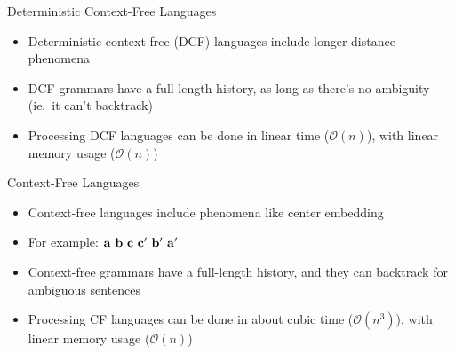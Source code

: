 \documentclass{beamer}
\newcommand{\detail}[1]{{\color{lightgrey}\small{}#1}}
\begin{document}
\begin{frame}{Deterministic Context-Free Languages}
\begin{block}{}
\begin{itemize}
	\item Deterministic context-free (DCF) languages include longer-distance phenomena
	\item DCF grammars have a full-length history, as long as there's no ambiguity (ie.\ it can't backtrack)
	\pause
	\item Processing DCF languages can be done in linear time \detail{($\mathcal{O}(n)$)}, with linear memory usage \detail{($\mathcal{O}(n)$)}
\end{itemize}
\end{block}
\end{frame}


\begin{frame}{Context-Free Languages}
\begin{block}{}
\begin{itemize}
	\item Context-free languages include phenomena like center embedding
	\item For example: $\bf a \ b \ c \ c^{\prime} \ b^{\prime} \ a^{\prime}$
	\pause
	\item Context-free grammars have a full-length history, and they can backtrack for ambiguous sentences
	\pause
	\item Processing CF languages can be done in about cubic time \detail{($\mathcal{O}(n^3)$)}, with linear memory usage \detail{($\mathcal{O}(n)$)}
\end{itemize}
\end{block}
\end{frame}
\end{document}
